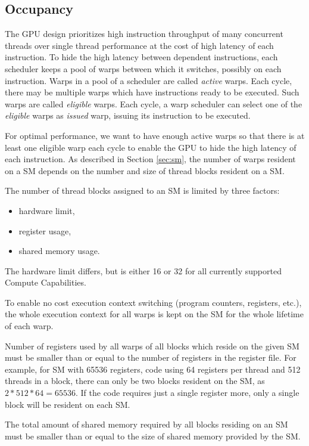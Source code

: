 \subsection{Occupancy}

The GPU design prioritizes high instruction throughput of many concurrent threads over single thread performance at the cost of high latency of each instruction. To hide the high latency between dependent instructions, each scheduler keeps a pool of warps between which it switches, possibly on each instruction. Warps in a pool of a scheduler are called \textit{active} warps.
Each cycle, there may be multiple warps which have instructions ready to be executed. Such warps are called \textit{eligible} warps.
Each cycle, a warp scheduler can select one of the \textit{eligible} warps as \textit{issued} warp, issuing its instruction to be executed.

For optimal performance, we want to have enough active warps so that there is at least one eligible warp each cycle to enable the GPU to hide the high latency of each instruction. As described in Section \ref{sec:sm}, the number of warps resident on a SM depends on the number and size of thread blocks resident on a SM.

The number of thread blocks assigned to an SM is limited by three factors:

\begin{itemize}
	\item hardware limit,
	\item register usage,
	\item shared memory usage.
\end{itemize}

The hardware limit differs, but is either 16 or 32 for all currently supported Compute Capabilities. 

To enable no cost execution context switching (program counters, registers, etc.), the whole execution context for all warps is kept on the SM for the whole lifetime of each warp. 


Number of registers used by all warps of all blocks which reside on the given SM must be smaller than or equal to the number of registers in the register file. For example, for SM with 65536 registers, code using 64 registers per thread and 512 threads in a block, there can only be two blocks resident on the SM, as $2*512*64 = 65536$. If the code requires just a single register more, only a single block will be resident on each SM.

The total amount of shared memory required by all blocks residing on an SM must be smaller than or equal to the size of shared memory provided by the SM. 

